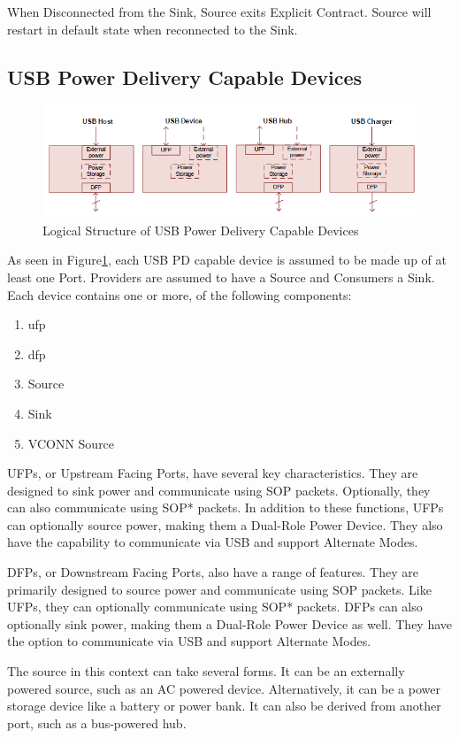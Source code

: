 When Disconnected from the Sink, Source exits Explicit Contract. Source will restart in default state when reconnected to the Sink.

\subsection{USB Power Delivery Capable Devices}
\begin{figure}[hbt]
    \centering
    \includegraphics[width=0.8\linewidth]{Chapter2/pd_cap_dev.png}
    \caption{Logical Structure of USB Power Delivery Capable Devices}
    \label{fig:pd_cap_dev}
\end{figure}
As seen in Figure\ref{fig:pd_cap_dev}, each USB PD capable device is assumed to be made up of at least one Port. Providers are assumed to have a Source and Consumers a Sink. Each device contains one or more, of the following components:
\begin{enumerate}
    \item \gls{ufp}
    \item \gls{dfp}
    \item Source
    \item Sink
    \item VCONN Source
\end{enumerate}
UFPs, or Upstream Facing Ports, have several key characteristics. They are designed to sink power and communicate using SOP packets. Optionally, they can also communicate using SOP* packets. In addition to these functions, UFPs can optionally source power, making them a Dual-Role Power Device. They also have the capability to communicate via USB and support Alternate Modes.

DFPs, or Downstream Facing Ports, also have a range of features. They are primarily designed to source power and communicate using SOP packets. Like UFPs, they can optionally communicate using SOP* packets. DFPs can also optionally sink power, making them a Dual-Role Power Device as well. They have the option to communicate via USB and support Alternate Modes.

The source in this context can take several forms. It can be an externally powered source, such as an AC powered device. Alternatively, it can be a power storage device like a battery or power bank. It can also be derived from another port, such as a bus-powered hub.

